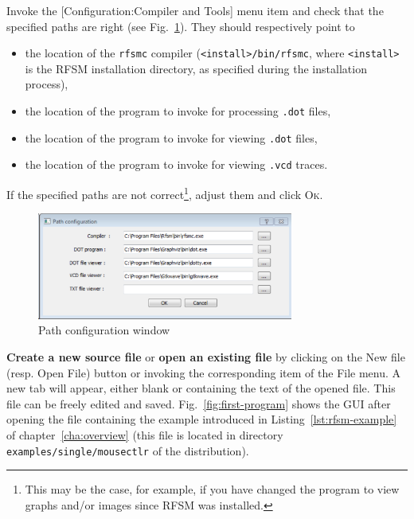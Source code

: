 \medskip
Invoke the [\textsf{Configuration:Compiler and Tools}] menu item and check that the specified paths
are right (see Fig.~\ref{fig:config-window}). They should respectively point to 
\begin{itemize}
\item the location of the \texttt{rfsmc} compiler (\verb|<install>/bin/rfsmc|, where
  \verb|<install>| is the RFSM installation directory, as specified during the installation
  process),
\item the location of the program to invoke for processing \verb|.dot| files, 
\item the location of the program to invoke for viewing \verb|.dot| files, 
\item the location of the program to invoke for viewing \verb|.vcd| traces. 
\end{itemize}
If the specified paths are not correct\footnote{This may be the case, for example, if you have
  changed the program to view graphs and/or images since RFSM was installed.}, adjust them and click \textsc{Ok}.

\begin{figure}[h]
  \centering
  \includegraphics[width=0.75\textwidth]{figs/gui/pathconfig}
  \caption{Path configuration window}
  \label{fig:config-window}
\end{figure}

\medskip \textbf{Create a new source file} or \textbf{open an existing file} by clicking on the
\textsf{New file} (resp. \textsf{Open File}) button 
or invoking the corresponding item of the \textsf{File} menu. A new tab will appear, either blank or
containing the text of the opened file. This file can be freely edited and
saved. Fig.~\ref{fig:first-program} shows the GUI after opening the file containing the example
introduced in Listing~\ref{lst:rfsm-example} of chapter~\ref{cha:overview} (this file is located in directory
  \texttt{examples/single/mousectlr} of the distribution).

